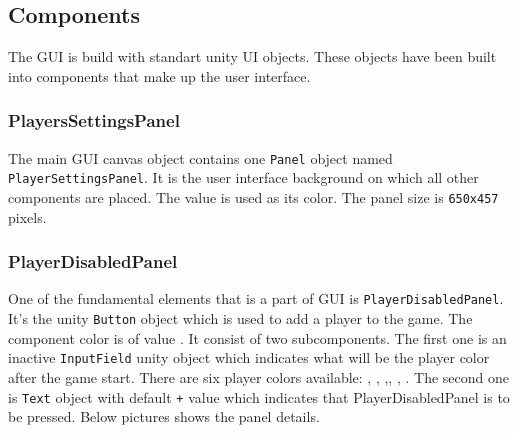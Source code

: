\subsection{Components}
\noindent The GUI is build with standart unity UI objects. These objects have been built into components that make up the user interface.

\subsubsection{PlayersSettingsPanel}\label{gui-playerssettingspanel}
\noindent The main GUI canvas object contains one \verb|Panel| object named \verb|PlayerSettingsPanel|. It is the user interface background on which all other components are placed. The  value is used as its color. The panel size is \verb|650x457| pixels.

\subsubsection{PlayerDisabledPanel}\label{gui-playerdisabledpanel}
\noindent One of the fundamental elements that is a part of GUI is \verb|PlayerDisabledPanel|. It's the unity \verb|Button| object which is used to add a player to the game. The component color is of value . It consist of two subcomponents. The first one is an inactive \verb|InputField| unity object which indicates what will be the player color after the game start. There are six player colors available: , , ,, , . The second one is \verb|Text| object with default \verb|+| value which indicates that PlayerDisabledPanel is to be pressed. Below pictures shows the panel details. \newpage

